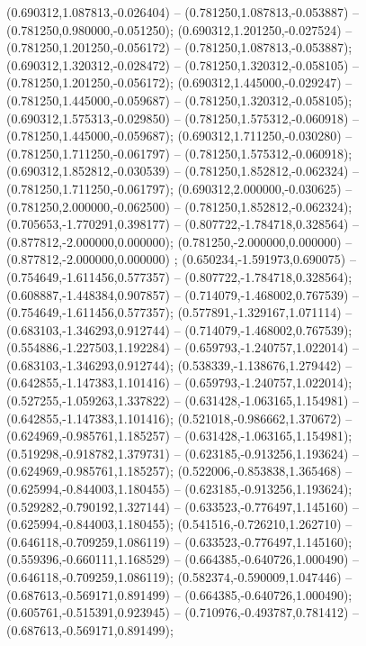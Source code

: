  (0.690312,1.087813,-0.026404) -- (0.781250,1.087813,-0.053887) -- (0.781250,0.980000,-0.051250);
 (0.690312,1.201250,-0.027524) -- (0.781250,1.201250,-0.056172) -- (0.781250,1.087813,-0.053887);
 (0.690312,1.320312,-0.028472) -- (0.781250,1.320312,-0.058105) -- (0.781250,1.201250,-0.056172);
 (0.690312,1.445000,-0.029247) -- (0.781250,1.445000,-0.059687) -- (0.781250,1.320312,-0.058105);
 (0.690312,1.575313,-0.029850) -- (0.781250,1.575312,-0.060918) -- (0.781250,1.445000,-0.059687);
 (0.690312,1.711250,-0.030280) -- (0.781250,1.711250,-0.061797) -- (0.781250,1.575312,-0.060918);
 (0.690312,1.852812,-0.030539) -- (0.781250,1.852812,-0.062324) -- (0.781250,1.711250,-0.061797);
 (0.690312,2.000000,-0.030625) -- (0.781250,2.000000,-0.062500) -- (0.781250,1.852812,-0.062324);
 (0.705653,-1.770291,0.398177) -- (0.807722,-1.784718,0.328564) -- (0.877812,-2.000000,0.000000);
 (0.781250,-2.000000,0.000000) -- (0.877812,-2.000000,0.000000) ;
 (0.650234,-1.591973,0.690075) -- (0.754649,-1.611456,0.577357) -- (0.807722,-1.784718,0.328564);
 (0.608887,-1.448384,0.907857) -- (0.714079,-1.468002,0.767539) -- (0.754649,-1.611456,0.577357);
 (0.577891,-1.329167,1.071114) -- (0.683103,-1.346293,0.912744) -- (0.714079,-1.468002,0.767539);
 (0.554886,-1.227503,1.192284) -- (0.659793,-1.240757,1.022014) -- (0.683103,-1.346293,0.912744);
 (0.538339,-1.138676,1.279442) -- (0.642855,-1.147383,1.101416) -- (0.659793,-1.240757,1.022014);
 (0.527255,-1.059263,1.337822) -- (0.631428,-1.063165,1.154981) -- (0.642855,-1.147383,1.101416);
 (0.521018,-0.986662,1.370672) -- (0.624969,-0.985761,1.185257) -- (0.631428,-1.063165,1.154981);
 (0.519298,-0.918782,1.379731) -- (0.623185,-0.913256,1.193624) -- (0.624969,-0.985761,1.185257);
 (0.522006,-0.853838,1.365468) -- (0.625994,-0.844003,1.180455) -- (0.623185,-0.913256,1.193624);
 (0.529282,-0.790192,1.327144) -- (0.633523,-0.776497,1.145160) -- (0.625994,-0.844003,1.180455);
 (0.541516,-0.726210,1.262710) -- (0.646118,-0.709259,1.086119) -- (0.633523,-0.776497,1.145160);
 (0.559396,-0.660111,1.168529) -- (0.664385,-0.640726,1.000490) -- (0.646118,-0.709259,1.086119);
 (0.582374,-0.590009,1.047446) -- (0.687613,-0.569171,0.891499) -- (0.664385,-0.640726,1.000490);
 (0.605761,-0.515391,0.923945) -- (0.710976,-0.493787,0.781412) -- (0.687613,-0.569171,0.891499);
